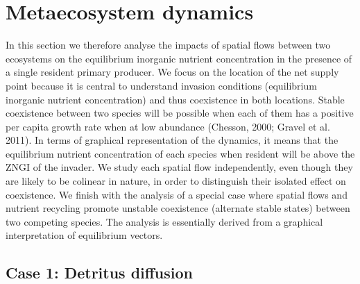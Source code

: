 \documentclass[letterpaper,twocolumn,showkeys]{revtex4-1}
\begin{document}
\section{Metaecosystem dynamics}

 In this section we therefore analyse the impacts of spatial flows between two ecosystems on the equilibrium inorganic nutrient concentration in the presence of a single resident primary producer. We focus on the location of the net supply point because it is central to understand invasion conditions (equilibrium inorganic nutrient concentration) and thus coexistence in both locations. Stable coexistence between two species will be possible when each of them has a positive per capita growth rate when at low abundance (Chesson, 2000; Gravel et al. 2011). In terms of graphical representation of the dynamics, it means that the equilibrium nutrient concentration of each species when resident will be above the ZNGI of the invader. We study each spatial flow independently, even though they are likely to be colinear in nature, in order to distinguish their isolated effect on coexistence. We finish with the analysis of a special case where spatial flows and nutrient recycling promote unstable coexistence (alternate stable states) between two competing species. The analysis is essentially derived from a graphical interpretation of equilibrium vectors.

\subsection{Case 1: Detritus diffusion}
\end{document}
